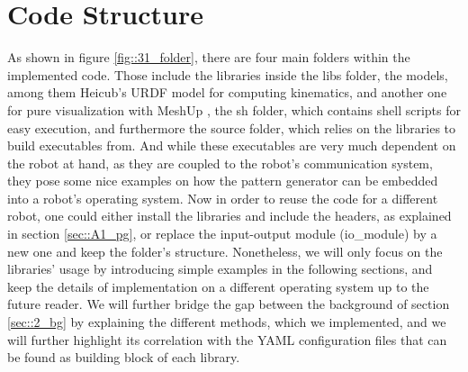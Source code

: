 \FloatBarrier
\section{Code Structure}
\label{sec::31_cs}
As shown in figure \ref{fig::31_folder}, there are four main folders within the implemented code. Those include the libraries inside the libs folder, the models, among them Heicub's URDF model for computing kinematics, and another one for pure visualization with MeshUp \cite{meshup}, the sh folder, which contains shell scripts for easy execution, and furthermore the source folder, which relies on the libraries to build executables from. And while these executables are very much dependent on the robot at hand, as they are coupled to the robot's communication system, they pose some nice examples on how the pattern generator can be embedded into a robot's operating system. Now in order to reuse the code for a different robot, one could either install the libraries and include the headers, as explained in section \ref{sec::A1_pg}, or replace the input-output module (io\_module) by a new one and keep the folder's structure. Nonetheless, we will only focus on the libraries' usage by introducing simple examples in the following sections, and keep the details of implementation on a different operating system up to the future reader. We will further bridge the gap between the background of section \ref{sec::2_bg} by explaining the different methods, which we implemented, and we will further highlight its correlation with the YAML \cite{ben2005yaml} configuration files that can be found as building block of each library. 
